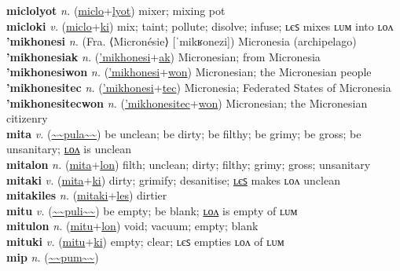 \textbf{miclolyot} \textit{n.} (\hyperref[miclo]{miclo}+\hyperref[lyot]{lyot})
mixer; mixing pot \label{miclolyot} \\
\textbf{micloki} \textit{v.} (\hyperref[miclo]{miclo}+\hyperref[ki]{ki})
mix; taint; pollute; disolve; infuse; ʟєꜱ mixes ʟᴜᴍ into ʟᴏᴧ \label{micloki} \\
\textbf{'mikhonesi} \textit{n.} (Fra. ⟨Micronésie⟩ [ˈmikʁonezi])
Micronesia (archipelago) \label{'mikhonesi} \\
\textbf{'mikhonesiak} \textit{n.} (\hyperref['mikhonesi]{'mikhonesi}+\hyperref[ak]{ak})
Micronesian; from Micronesia \label{'mikhonesiak} \\
\textbf{'mikhonesiwon} \textit{n.} (\hyperref['mikhonesi]{'mikhonesi}+\hyperref[won]{won})
Micronesian; the Micronesian people \label{'mikhonesiwon} \\
\textbf{'mikhonesitec} \textit{n.} (\hyperref['mikhonesi]{'mikhonesi}+\hyperref[tec]{tec})
Micronesia; Federated States of Micronesia \label{'mikhonesitec} \\
\textbf{'mikhonesitecwon} \textit{n.} (\hyperref['mikhonesitec]{'mikhonesitec}+\hyperref[won]{won})
Micronesian; the Micronesian citizenry \label{'mikhonesitecwon} \\
\textbf{mita} \textit{v.} (\hyperref[pula]{\~{}\~{}pula\~{}\~{}})
be unclean; be dirty; be filthy; be grimy; be gross; be unsanitary; \hyperref[mitalon]{ʟᴏᴧ} is unclean \label{mita} \\
\textbf{mitalon} \textit{n.} (\hyperref[mita]{mita}+\hyperref[lon]{lon})
filth; unclean; dirty; filthy; grimy; gross; unsanitary \label{mitalon} \\
\textbf{mitaki} \textit{v.} (\hyperref[mita]{mita}+\hyperref[ki]{ki})
dirty; grimify; desanitise; \hyperref[mitakiles]{ʟєꜱ} makes ʟᴏᴧ unclean \label{mitaki} \\
\textbf{mitakiles} \textit{n.} (\hyperref[mitaki]{mitaki}+\hyperref[les]{les})
dirtier \label{mitakiles} \\
\textbf{mitu} \textit{v.} (\hyperref[puli]{\~{}\~{}puli\~{}\~{}})
be empty; be blank; \hyperref[mitulon]{ʟᴏᴧ} is empty of ʟᴜᴍ \label{mitu} \\
\textbf{mitulon} \textit{n.} (\hyperref[mitu]{mitu}+\hyperref[lon]{lon})
void; vacuum; empty; blank \label{mitulon} \\
\textbf{mituki} \textit{v.} (\hyperref[mitu]{mitu}+\hyperref[ki]{ki})
empty; clear; ʟєꜱ empties ʟᴏᴧ of ʟᴜᴍ \label{mituki} \\
\textbf{mip} \textit{n.} (\hyperref[pum]{\~{}\~{}pum\~{}\~{}})
